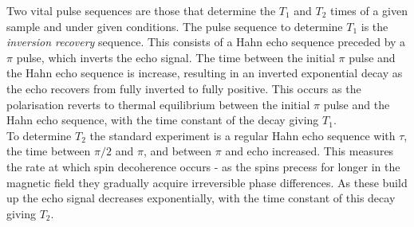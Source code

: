 Two vital pulse sequences are those that determine the $T_1$ and $T_2$ times of a given sample and under given conditions. 
The pulse sequence to determine $T_1$ is the \emph{inversion recovery} sequence.
This consists of a Hahn echo sequence preceded by a $\pi$ pulse, which inverts the echo signal.
The time between the initial $\pi$ pulse and the Hahn echo sequence is increase, resulting in an inverted exponential decay as the echo recovers from fully inverted to fully positive.
This occurs as the polarisation reverts to thermal equilibrium between the initial $\pi$ pulse and the Hahn echo sequence, with the time constant of the decay giving $T_1$.
\\
To determine $T_2$ the standard experiment is a regular Hahn echo sequence with $\tau$, the time between $\pi/2$ and $\pi$, and between $\pi$ and echo increased. 
This measures the rate at which spin decoherence occurs - as the spins precess for longer in the magnetic field they gradually acquire irreversible phase differences.
As these build up the echo signal decreases exponentially, with the time constant of this decay giving $T_2$.

